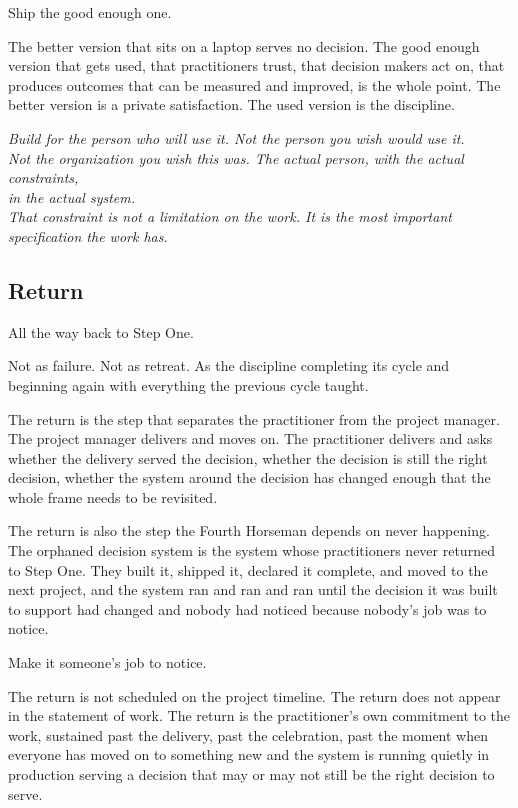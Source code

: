 Ship the good enough one.

The better version that sits on a laptop serves no decision. The good enough version that gets used, that practitioners trust, that decision makers act on, that produces outcomes that can be measured and improved, is the whole point. The better version is a private satisfaction. The used version is the discipline.

\begin{center}\small\itshape
  Build for the person who will use it. Not the person you wish would use it.\\
  Not the organization you wish this was. The actual person, with the actual constraints,\\
  in the actual system.\\
  That constraint is not a limitation on the work. It is the most important specification the work has.
\end{center}

\subsection*{Return}

All the way back to Step One.

Not as failure. Not as retreat. As the discipline completing its cycle and beginning again with everything the previous cycle taught.

The return is the step that separates the practitioner from the project manager. The project manager delivers and moves on. The practitioner delivers and asks whether the delivery served the decision, whether the decision is still the right decision, whether the system around the decision has changed enough that the whole frame needs to be revisited.

The return is also the step the Fourth Horseman depends on never happening. The orphaned decision system is the system whose practitioners never returned to Step One. They built it, shipped it, declared it complete, and moved to the next project, and the system ran and ran and ran until the decision it was built to support had changed and nobody had noticed because nobody's job was to notice.

Make it someone's job to notice.

The return is not scheduled on the project timeline. The return does not appear in the statement of work. The return is the practitioner's own commitment to the work, sustained past the delivery, past the celebration, past the moment when everyone has moved on to something new and the system is running quietly in production serving a decision that may or may not still be the right decision to serve.


